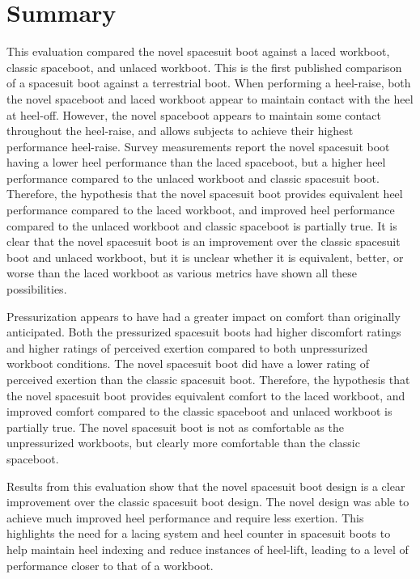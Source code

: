 \documentclass[defaultstyle,11pt]{thesis}
\begin{document}
\hypertarget{summary-6}{%
\section{Summary}\label{summary-6}}

This evaluation compared the novel spacesuit boot against a laced workboot, classic spaceboot, and unlaced workboot.
This is the first published comparison of a spacesuit boot against a terrestrial boot.
When performing a heel-raise, both the novel spaceboot and laced workboot appear to maintain contact with the heel at heel-off.
However, the novel spaceboot appears to maintain some contact throughout the heel-raise, and allows subjects to achieve their highest performance heel-raise.
Survey measurements report the novel spacesuit boot having a lower heel performance than the laced spaceboot, but a higher heel performance compared to the unlaced workboot and classic spacesuit boot.
Therefore, the hypothesis that the novel spacesuit boot provides equivalent heel performance compared to the laced workboot, and improved heel performance compared to the unlaced workboot and classic spaceboot is partially true.
It is clear that the novel spacesuit boot is an improvement over the classic spacesuit boot and unlaced workboot, but it is unclear whether it is equivalent, better, or worse than the laced workboot as various metrics have shown all these possibilities.

Pressurization appears to have had a greater impact on comfort than originally anticipated.
Both the pressurized spacesuit boots had higher discomfort ratings and higher ratings of perceived exertion compared to both unpressurized workboot conditions.
The novel spacesuit boot did have a lower rating of perceived exertion than the classic spacesuit boot.
Therefore, the hypothesis that the novel spacesuit boot provides equivalent comfort to the laced workboot, and improved comfort compared to the classic spaceboot and unlaced workboot is partially true.
The novel spacesuit boot is not as comfortable as the unpressurized workboots, but clearly more comfortable than the classic spaceboot.

Results from this evaluation show that the novel spacesuit boot design is a clear improvement over the classic spacesuit boot design.
The novel design was able to achieve much improved heel performance and require less exertion.
This highlights the need for a lacing system and heel counter in spacesuit boots to help maintain heel indexing and reduce instances of heel-lift, leading to a level of performance closer to that of a workboot.
\end{document}
